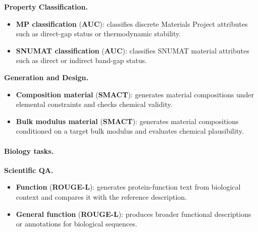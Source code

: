 \begin{appendices}
\textbf{Property Classification.}
\begin{itemize}
    \item \textbf{MP classification} (\textbf{AUC}): classifies discrete Materials Project attributes such as direct-gap status or thermodynamic stability.
    \item \textbf{SNUMAT classification} (\textbf{AUC}): classifies SNUMAT material attributes such as direct or indirect band-gap status.
\end{itemize}

\textbf{Generation and Design.}
\begin{itemize}
    \item \textbf{Composition material} (\textbf{SMACT}): generates material compositions under elemental constraints and checks chemical validity.
    \item \textbf{Bulk modulus material} (\textbf{SMACT}): generates material compositions conditioned on a target bulk modulus and evaluates chemical plausibility.
\end{itemize}

\paragraph{Biology tasks.}
\textbf{Scientific QA.}
\begin{itemize}
    \item \textbf{Function} (\textbf{ROUGE-L}): generates protein-function text from biological context and compares it with the reference description.
    \item \textbf{General function} (\textbf{ROUGE-L}): produces broader functional descriptions or annotations for biological sequences.
\end{itemize}


\end{appendices}
